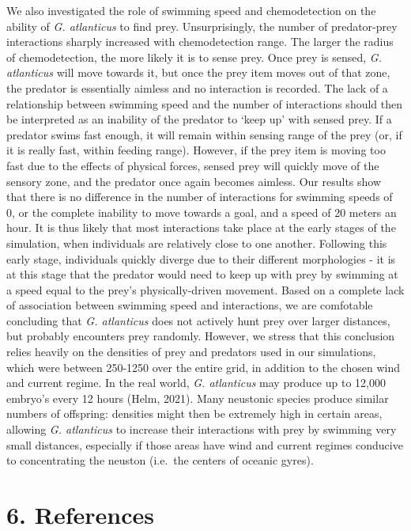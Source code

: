 \documentclass[
]{article}
\begin{document}
We also investigated the role of swimming speed and chemodetection on
the ability of \emph{G. atlanticus} to find prey. Unsurprisingly, the
number of predator-prey interactions sharply increased with
chemodetection range. The larger the radius of chemodetection, the more
likely it is to sense prey. Once prey is sensed, \emph{G. atlanticus}
will move towards it, but once the prey item moves out of that zone, the
predator is essentially aimless and no interaction is recorded. The lack
of a relationship between swimming speed and the number of interactions
should then be interpreted as an inability of the predator to `keep up'
with sensed prey. If a predator swims fast enough, it will remain within
sensing range of the prey (or, if it is really fast, within feeding
range). However, if the prey item is moving too fast due to the effects
of physical forces, sensed prey will quickly move of the sensory zone,
and the predator once again becomes aimless. Our results show that there
is no difference in the number of interactions for swimming speeds of 0,
or the complete inability to move towards a goal, and a speed of 20
meters an hour. It is thus likely that most interactions take place at
the early stages of the simulation, when individuals are relatively
close to one another. Following this early stage, individuals quickly
diverge due to their different morphologies - it is at this stage that
the predator would need to keep up with prey by swimming at a speed
equal to the prey's physically-driven movement. Based on a complete lack
of association between swimming speed and interactions, we are
comfotable concluding that \emph{G. atlanticus} does not actively hunt
prey over larger distances, but probably encounters prey randomly.
However, we stress that this conclusion relies heavily on the densities
of prey and predators used in our simulations, which were between
250-1250 over the entire grid, in addition to the chosen wind and
current regime. In the real world, \emph{G. atlanticus} may produce up
to 12,000 embryo's every 12 hours (Helm, 2021). Many neustonic species
produce similar numbers of offspring: densities might then be extremely
high in certain areas, allowing \emph{G. atlanticus} to increase their
interactions with prey by swimming very small distances, especially if
those areas have wind and current regimes conducive to concentrating the
neuston (i.e.~the centers of oceanic gyres).

\hypertarget{references}{%
\section{6. References}\label{references}}
\end{document}
